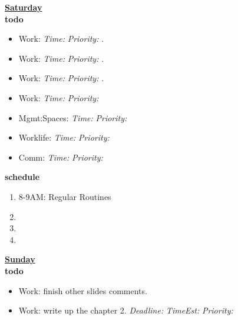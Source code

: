 \documentclass[serif, mathserif, final]{beamer}
\newcommand{\timeEst}[1]{\textit{Time:} \textit{#1}}
\newcommand{\te}[1]{\textit{TimeEst:} \textit{#1}}
\newcommand{\priority}[1]{\textit{Priority:} \textit{#1}}
\newcommand{\pr}[1]{\textit{Priority:} \textit{#1}}
\newcommand{\deadline}[1]{#1}
\newcommand{\dl}[1]{\textit{Deadline:}#1}
\begin{document}
{            \textbf{\small \underline{Saturday}} \\
            \textbf{\small todo} \\
            \begin{itemize} 
              \tiny \item \tiny Work:                                      \deadline{} \timeEst{} \priority{}. 
            \item \tiny Work:                                              \deadline{ }   \timeEst{}  \priority{}.
            \item \tiny Work:                                              \deadline{ }   \timeEst{}  \priority{}. 
            \item \tiny Work:                                              \deadline{} \timeEst{} \priority{} 
            \item \tiny Mgmt:Spaces:                                       \deadline{} \timeEst{} \priority{} 
            \item \tiny Worklife:                                          \deadline{} \timeEst{} \priority{} 
            \item \tiny Comm:                                              \deadline{} \timeEst{} \priority{} 
            \end{itemize} 
            \textbf{\small schedule} \\
            \begin{enumerate}
              \tiny \item \tiny 8-9AM: Regular Routines 
            \item \tiny 
            \item \tiny 
            \item \tiny   
            \end{enumerate} 

            \textbf{\small \underline{Sunday}} \\
            \textbf{\small todo} \\
            \begin{itemize} 
              \tiny \item \tiny Work: finish other slides comments. 
              \tiny \item \tiny Work: write up the chapter 2.  \dl{} \te{}  \pr{} 


\end{itemize}}
\end{document}

